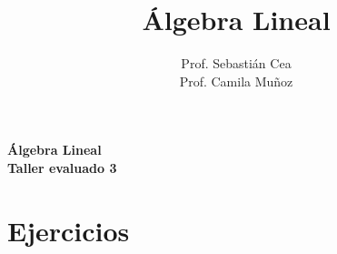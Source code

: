 \documentclass[12pt]{article}
\title{\'Algebra Lineal}
\author{Prof. Sebasti\'an Cea \\Prof. Camila Muñoz\\
}
\date{}
\theoremstyle{exampstyle}
\theoremstyle{definition}
\theoremstyle{break}
\numberwithin{equation}{section}
\begin{document}

\begin{minipage}[r]{15cm}


\end{minipage}

\begin{center}
\Large{\textbf{\'Algebra Lineal\\Taller evaluado 3  }}
\end{center}

\section{Ejercicios}
\end{document}
